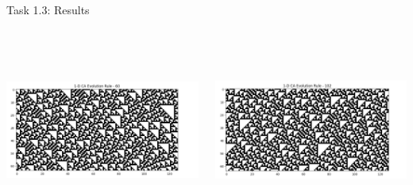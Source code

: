 \documentclass[aspectratio=169]{beamer}
\begin{document}
\begin{frame}{Task 1.3: Results}
\begin{columns}
    \begin{column}{0.5\textwidth}
        \includegraphics[width=08cm, height=06cm]{task_1.3_rule_60.png}
    \end{column}
    \begin{column}{0.5\textwidth}
        \includegraphics[width=08cm, height=06cm]{task_1.3_rule_102.png}
    \end{column}
\end{columns}
\end{frame}
\end{document}
